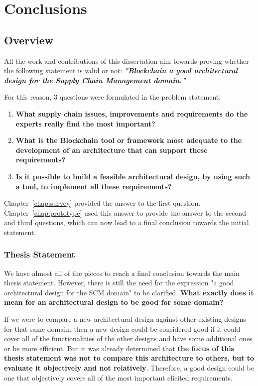 \chapter{Conclusions}
\label{chap:conclusions}
\minitoc \mtcskip \noindent

\section{Overview}

All the work and contributions of this dissertation aim towards proving whether the following statement is valid or not: \textbf{\textit{"Blockchain a good architectural design for the Supply Chain Management domain."}}

 For this reason, 3 questions were formulated in the problem statement:
\begin{enumerate}
    \item \textbf{What supply chain issues, improvements and requirements do the experts really find the most important?}
    \item \textbf{What is the Blockchain tool or framework most adequate to the development of an architecture that can support these requirements?}
    \item \textbf{Is it possible to build a feasible architectural design, by using such a tool, to implement all these requirements?}
\end{enumerate}
    
Chapter~\ref{chap:survey} provided the answer to the first question. Chapter~\ref{chap:prototype} used this answer to provide the answer to the second and third questions, which can now lead to a final conclusion towards the initial statement.


\subsection*{Thesis Statement}
\par We have almost all of the pieces to reach a final conclusion towards the main thesis statement. However, there is still the need for the expression "a good architectural design for the SCM domain" to be clarified. \textbf{What exactly does it mean for an architectural design to be good for some domain?} 

If we were to compare a new architectural design against other existing designs for that same domain, then a new design could be considered good if it could cover all of the functionalities of the other designs and have some additional ones or be more efficient. But it was already determined that \textbf{the focus of this thesis statement was not to compare this architecture to others, but to evaluate it objectively and not relatively}. Therefore, a good design could be one that objectively covers all of the most important elicited requirements.


